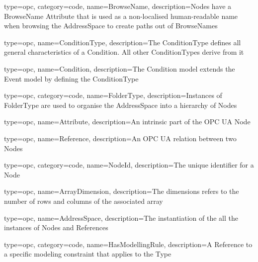 {
  type=opc,
  category=code,
  name=BrowseName,
  description={Nodes have a BrowseName Attribute that is used as a non-localised human-readable name when browsing the AddressSpace to create paths out of BrowseNames}
}

{
    type=opc,
    name=ConditionType,
    description={The ConditionType defines all general characteristics of a Condition. All other ConditionTypes derive from it}
}

{
    type=opc,
    name=Condition,
    description={The Condition model extends the Event model by defining the ConditionType}
}

{
  type=opc,
  category=code,
  name=FolderType,
  description={Instances of FolderType are used to organise the AddressSpace into a hierarchy of Nodes}
}



{
  type=opc,
  name=Attribute,
  description={An intrinsic part of the OPC UA Node}
}

{
  type=opc,
  name=Reference,
  description={An OPC UA relation between two \glspl{Node}}
}

{
  type=opc,
  category=code,
  name=NodeId,
  description={The unique identifier for a \gls{Node}}
}
  
{
  type=opc,
  name=ArrayDimension,
  description={The dimensions refers to the number of rows and columns of the associated array}
}

{
  type=opc,
  name=AddressSpace,
  description={The instantiation of the all the instances of \glspl{Node} and \glspl{Reference}}
}

{
  type=opc,
  category=code,
  name=HasModellingRule,
  description={A \gls{Reference} to a specific modeling constraint that applies to the \gls{Type}}
}

